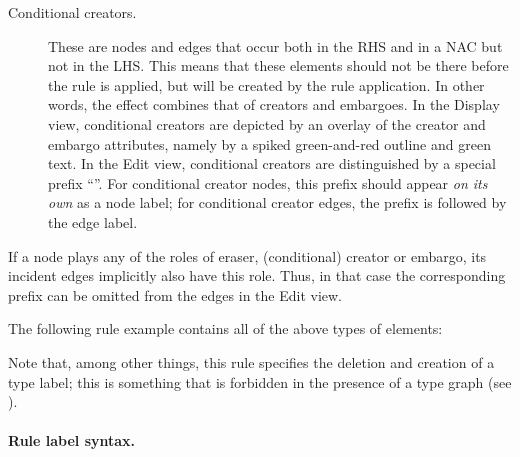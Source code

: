 \begin{description}
\item[Conditional creators.] These are nodes and edges that occur both in the
  RHS and in a NAC but not in the LHS. This means that these elements should
  not be there before the rule is applied, but will be created by the rule
  application. In other words, the effect combines that of creators and
  embargoes. In the Display view, conditional creators are depicted by an
  overlay of the creator and embargo attributes, namely by a spiked
  green-and-red outline and green text. In the Edit view, conditional creators
  are distinguished by a special prefix ``\cnewP''. For conditional creator
  nodes, this prefix should appear \emph{on its own} as a node label; for
  conditional creator edges, the prefix is followed by the edge label.
\end{description}
%
If a node plays any of the roles of eraser, (conditional) creator or embargo,
its incident edges implicitly also have this role. Thus, in that case the
corresponding prefix can be omitted from the edges in the Edit view.

\medskip\noindent The following rule example contains all of the above types of
elements:


Note that, among other things, this rule specifies the deletion and creation of
a type label; this is something that is forbidden in the presence of a type
graph (see ).

\paragraph{Rule label syntax.}

